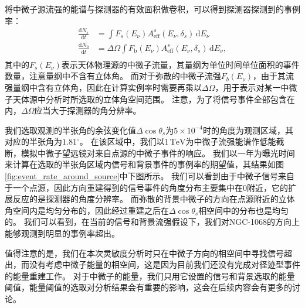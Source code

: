 将中微子源流强的能谱与探测器的有效面积做卷积，可以得到探测器探测到的事例率：
\begin{equation}
\begin{aligned}
    \frac{\mathrm{d}N_s}{\mathrm{d}t} &= \int F_s(E_\nu)  A_\mathrm{eff}^s (E_\nu, \delta_s) \,\mathrm{d} E_\nu \\ 
    \frac{\mathrm{d}N_\mathrm{b}}{\mathrm{d}t} &= \Delta \Omega \int F_\mathrm{b}(E_\nu)  A_\mathrm{eff}^s (E_\nu, \delta_s) \,\mathrm{d} E_\nu, \\
\end{aligned}
    \label{eq:event_rate_using_eff}
\end{equation}
其中的$F_s(E_\nu)$表示天体物理源的中微子流量，其量纲为单位时间单位面积的事件数量，注意量纲中不含有立体角。
而对于弥散的中微子流强$F_b(E_\nu)$，由于其流强量纲中含有立体角，因此在计算实例率时需要再乘以$\Delta\Omega$，用于表示对某一中微子天体源中分析时所选取的立体角空间范围。
注意，为了将信号事件全部包含在内，$\Delta\Omega$应当大于探测器的角分辨率。

我们选取观测的半张角的余弦变化值$\Delta\cos\theta_s$为$5\times 10^{-4}$时的角度为观测区域，其对应的半张角为$1.81^\circ$。
在该区域中，我们以$1\,\mathrm{TeV}$为中微子流强能谱作低能截断，模拟中微子望远镜对来自点源的中微子事件的响应。
我们以一年为曝光时间来计算在选取的半张角区域内信号和背景事件的事例率的期望值，其结果如图\ref{fig:event_rate_around_source}中下图所示。
我们可以看到由于中微子信号来自于一个点源，因此方向重建得到的信号事件的角度分布主要集中在0附近，它的扩展反应的是探测器的角度分辨率。
而弥散的背景中微子的方向在点源附近的立体角空间内是均匀分布的，因此经过重建之后在$\Delta\cos\theta_s$相空间中的分布也是均匀的。
我们可以看到，在当前的信号和背景流强假设下，我们对NGC-1068的方向上能够观测到明显的事例率超出。

值得注意的是，我们在本次灵敏度分析时只在中微子方向的相空间中寻找信号超出，而没有考虑中微子能量的相空间，这是因为目前我们还没有完成对径迹型事件的能量重建工作。
对于中微子的能量，我们只用它设置的信号和背景选取的能量阈值，能量阈值的选取对分析结果会有重要的影响，这会在后续内容会有更多的讨论。

